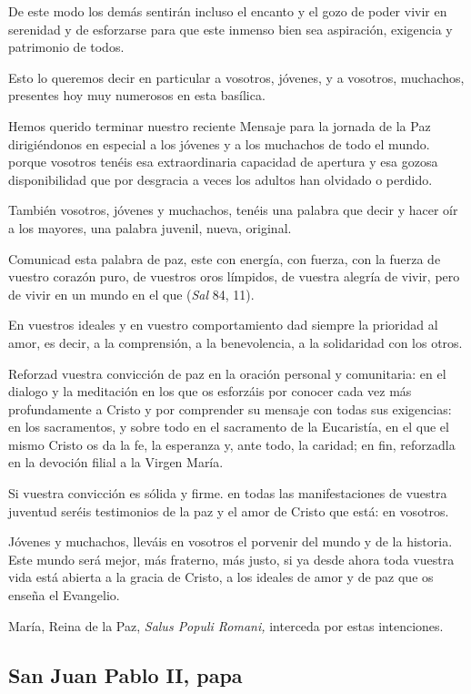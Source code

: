De este modo los demás sentirán incluso el encanto y el gozo de poder vivir en serenidad y de esforzarse para que este inmenso bien sea aspiración, exigencia y patrimonio de todos.

Esto lo queremos decir en particular a vosotros, jóvenes, y a vosotros, muchachos, presentes hoy muy numerosos en esta basílica.

Hemos querido terminar nuestro reciente Mensaje para la jornada de la Paz dirigiéndonos en especial a los jóvenes y a los muchachos de todo el mundo. porque vosotros tenéis esa extraordinaria capacidad de apertura y esa gozosa disponibilidad que por desgracia a veces los adultos han olvidado o perdido.

También vosotros, jóvenes y muchachos, tenéis una palabra que decir y hacer oír a los mayores, una palabra juvenil, nueva, original.

Comunicad esta palabra de paz, este  con energía, con fuerza, con la fuerza de vuestro corazón puro, de vuestros oros límpidos, de vuestra alegría de vivir, pero de vivir en un mundo en el que  (\emph{Sal} 84, 11).

En vuestros ideales y en vuestro comportamiento dad siempre la prioridad al amor, es decir, a la comprensión, a la benevolencia, a la solidaridad con los otros.

Reforzad vuestra convicción de paz en la oración personal y comunitaria: en el dialogo y la meditación en los que os esforzáis por conocer cada vez más profundamente a Cristo y por comprender su mensaje con todas sus exigencias: en los sacramentos, y sobre todo en el sacramento de la Eucaristía, en el que el mismo Cristo os da la fe, la esperanza y, ante todo, la caridad; en fin, reforzadla en la devoción filial a la Virgen María.

Si vuestra convicción es sólida y firme. en todas las manifestaciones de vuestra juventud seréis testimonios de la paz y el amor de Cristo que está: en vosotros.

Jóvenes y muchachos, lleváis en vosotros el porvenir del mundo y de la historia. Este mundo será mejor, más fraterno, más justo, si ya desde ahora toda vuestra vida está abierta a la gracia de Cristo, a los ideales de amor y de paz que os enseña el Evangelio.

María, Reina de la Paz, \emph{Salus Populi Romani,} interceda por estas intenciones.

\subsection{San Juan Pablo II, papa}

